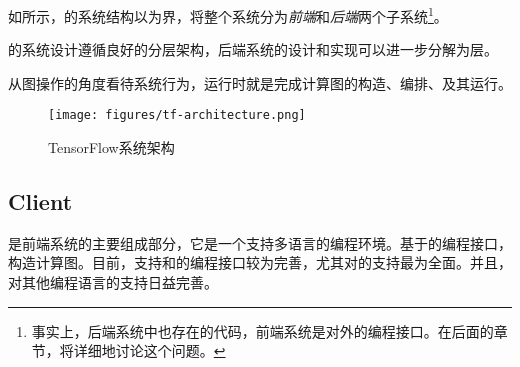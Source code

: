 \begin{content}

如所示，\tf{}的系统结构以为界，将整个系统分为\emph{前端}和\emph{后端}两个子系统\footnote{事实上，后端系统中也存在的代码，前端系统是\tf{}对外的编程接口。在后面的章节，将详细地讨论这个问题。}。

\begin{enum}
\end{enum}

\tf{}的系统设计遵循良好的分层架构，后端系统的设计和实现可以进一步分解为层。

\begin{enum}
\end{enum}

从图操作的角度看待系统行为，\tf{}运行时就是完成计算图的构造、编排、及其运行。

\begin{enum}
\end{enum}

\begin{figure}[H]
\centering
\texttt{[image: figures/tf-architecture.png]}
\caption{TensorFlow系统架构}
 \label{fig:tf-architecture}
\end{figure}

\subsection{Client}

是前端系统的主要组成部分，它是一个支持多语言的编程环境。基于的编程接口，构造计算图。目前，支持和的编程接口较为完善，尤其对的支持最为全面。并且，对其他编程语言的支持日益完善。


\end{content}
